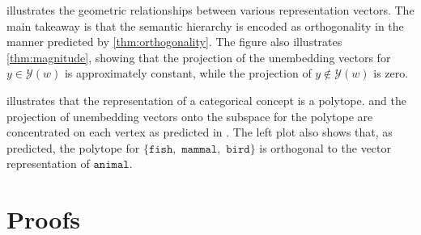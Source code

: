 \documentclass{article}
\newcommand{\ConceptName}[1]{$\mathtt{#1}$}
\newcommand{\ConceptValue}[1]{\texttt{#1}}
\newcommand{\yquad}{\mathcal{Y}}
\begin{document}
 illustrates the geometric relationships between various representation vectors. The main takeaway is that the semantic hierarchy is encoded as orthogonality in the manner predicted by \cref{thm:orthogonality}. The figure also illustrates \cref{thm:magnitude}, showing that the projection of the unembedding vectors for $y\in \yquad(w)$ is approximately constant, while the projection of $y\not \in \yquad(w)$ is zero.

 illustrates that the representation of a categorical concept is a polytope. and the projection of unembedding vectors onto the subspace for the polytope are concentrated on each vertex as predicted in .
The left plot also shows that, as predicted, the polytope for $\{\ConceptValue{fish},$ $\ConceptValue{mammal},$ $\ConceptValue{bird}\}$ is orthogonal to the vector representation of \ConceptName{animal}.


\section{Proofs}\label{sec:proofs}
\end{document}
